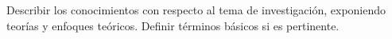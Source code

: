Describir los conocimientos con respecto al tema de investigación, exponiendo teorías y enfoques teóricos. Definir términos básicos si es pertinente. 
